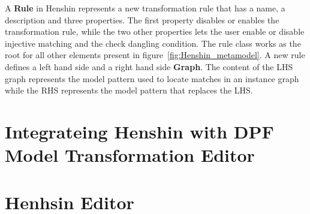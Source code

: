 A \textbf{Rule} in Henshin represents a new transformation rule that has a name,
a description and three properties. The first property disables or enables the
transformation rule, while the two other properties lets the user enable or
disable injective matching and the check dangling condition. The rule class
works as the root for all other elements present in
figure~\ref{fig:Henshin_metamodel}. A new rule defines a left hand side and a
right hand side \textbf{Graph}. The content of the LHS graph represents the
model pattern used to locate matches in an instance graph while the RHS
represents the model pattern that replaces the LHS. 



\section{Integrateing Henshin with DPF Model Transformation Editor}

\section{Henhsin Editor}



